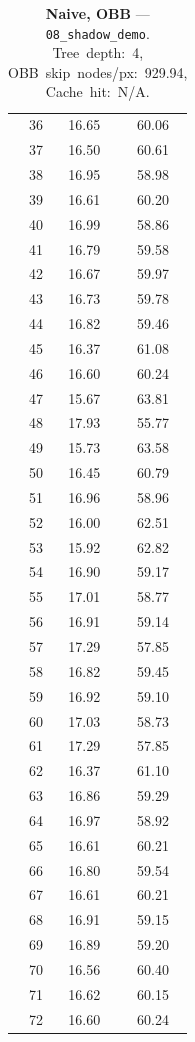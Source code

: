\begin{table}[htbp]
\begin{tabular}{@{}rcc@{}}
    36 & 16.65 & 60.06 \\
    37 & 16.50 & 60.61 \\
    38 & 16.95 & 58.98 \\
    39 & 16.61 & 60.20 \\
    40 & 16.99 & 58.86 \\
    41 & 16.79 & 59.58 \\
    42 & 16.67 & 59.97 \\
    43 & 16.73 & 59.78 \\
    44 & 16.82 & 59.46 \\
    45 & 16.37 & 61.08 \\
    46 & 16.60 & 60.24 \\
    47 & 15.67 & 63.81 \\
    48 & 17.93 & 55.77 \\
    49 & 15.73 & 63.58 \\
    50 & 16.45 & 60.79 \\
    51 & 16.96 & 58.96 \\
    52 & 16.00 & 62.51 \\
    53 & 15.92 & 62.82 \\
    54 & 16.90 & 59.17 \\
    55 & 17.01 & 58.77 \\
    56 & 16.91 & 59.14 \\
    57 & 17.29 & 57.85 \\
    58 & 16.82 & 59.45 \\
    59 & 16.92 & 59.10 \\
    60 & 17.03 & 58.73 \\
    61 & 17.29 & 57.85 \\
    62 & 16.37 & 61.10 \\
    63 & 16.86 & 59.29 \\
    64 & 16.97 & 58.92 \\
    65 & 16.61 & 60.21 \\
    66 & 16.80 & 59.54 \\
    67 & 16.61 & 60.21 \\
    68 & 16.91 & 59.15 \\
    69 & 16.89 & 59.20 \\
    70 & 16.56 & 60.40 \\
    71 & 16.62 & 60.15 \\
    72 & 16.60 & 60.24 \\
    \bottomrule
  \end{tabular}
  \caption{\textbf{Naive, OBB} --- \texttt{08\_shadow\_demo}. Tree~depth:~4, OBB~skip~nodes/px:~929.94, Cache~hit:~N/A.}
  \label{tab:rt-08-shadow-demo-Naive-OBB}
\end{table}

